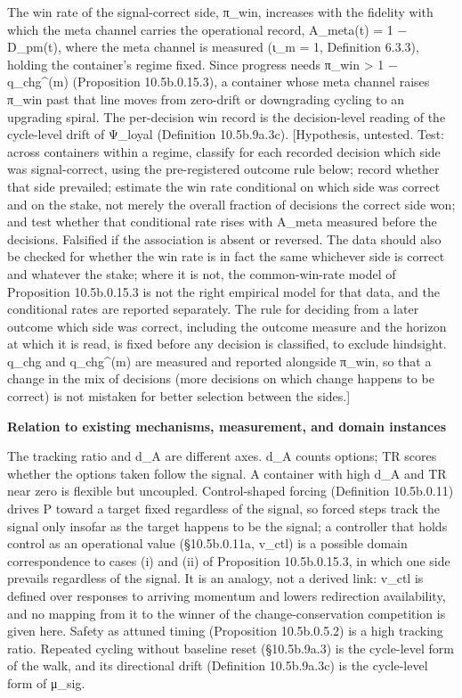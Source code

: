 \documentclass[
]{article}
\begin{document}
The win rate of the signal-correct side, π\_win, increases with the
fidelity with which the meta channel carries the operational record,
A\_meta(t) = 1 − D\_pm(t), where the meta channel is measured (ι\_m = 1,
Definition 6.3.3), holding the container's regime fixed. Since progress
needs π\_win \textgreater{} 1 − q\_chg\^{}(m) (Proposition
10.5b.0.15.3), a container whose meta channel raises π\_win past that
line moves from zero-drift or downgrading cycling to an upgrading
spiral. The per-decision win record is the decision-level reading of the
cycle-level drift of Ψ\_loyal (Definition 10.5b.9a.3c). {[}Hypothesis,
untested. Test: across containers within a regime, classify for each
recorded decision which side was signal-correct, using the
pre-registered outcome rule below; record whether that side prevailed;
estimate the win rate conditional on which side was correct and on the
stake, not merely the overall fraction of decisions the correct side
won; and test whether that conditional rate rises with A\_meta measured
before the decisions. Falsified if the association is absent or
reversed. The data should also be checked for whether the win rate is in
fact the same whichever side is correct and whatever the stake; where it
is not, the common-win-rate model of Proposition 10.5b.0.15.3 is not the
right empirical model for that data, and the conditional rates are
reported separately. The rule for deciding from a later outcome which
side was correct, including the outcome measure and the horizon at which
it is read, is fixed before any decision is classified, to exclude
hindsight. q\_chg and q\_chg\^{}(m) are measured and reported alongside
π\_win, so that a change in the mix of decisions (more decisions on
which change happens to be correct) is not mistaken for better selection
between the sides.{]}

\textbf{Relation to existing mechanisms, measurement, and domain
instances}

The tracking ratio and d\_A are different axes. d\_A counts options; TR
scores whether the options taken follow the signal. A container with
high d\_A and TR near zero is flexible but uncoupled. Control-shaped
forcing (Definition 10.5b.0.11) drives P toward a target fixed
regardless of the signal, so forced steps track the signal only insofar
as the target happens to be the signal; a controller that holds control
as an operational value (§10.5b.0.11a, v\_ctl) is a possible domain
correspondence to cases (i) and (ii) of Proposition 10.5b.0.15.3, in
which one side prevails regardless of the signal. It is an analogy, not
a derived link: v\_ctl is defined over responses to arriving momentum
and lowers redirection availability, and no mapping from it to the
winner of the change-conservation competition is given here. Safety as
attuned timing (Proposition 10.5b.0.5.2) is a high tracking ratio.
Repeated cycling without baseline reset (§10.5b.9a.3) is the cycle-level
form of the walk, and its directional drift (Definition 10.5b.9a.3c) is
the cycle-level form of μ\_sig.
\end{document}
